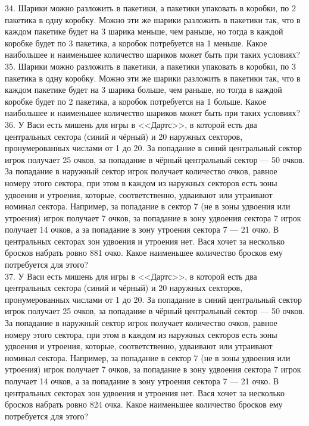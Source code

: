 34. Шарики можно разложить в пакетики, а пакетики упаковать в коробки, по 2 пакетика в одну коробку. Можно эти же шарики разложить в пакетики так, что в каждом пакетике будет на 3 шарика меньше, чем раньше, но тогда в каждой коробке будет по 3 пакетика, а коробок потребуется на 1 меньше. Какое наибольшее и наименьшее количество шариков может быть при таких условиях?\\
35. Шарики можно разложить в пакетики, а пакетики упаковать в коробки, по 3 пакетика в одну коробку. Можно эти же шарики разложить в пакетики так, что в каждом пакетике будет на 3 шарика больше, чем раньше, но тогда в каждой коробке будет по 2 пакетика, а коробок потребуется на 1 больше. Какое наибольшее и наименьшее количество шариков может быть при таких условиях?\\
36. У Васи есть мишень для игры в <<Дартс>>, в которой есть два центральных сектора (синий и чёрный) и 20 наружных секторов, пронумерованных числами от 1 до 20. За попадание в синий центральный сектор игрок получает 25 очков, за попадание в чёрный центральный сектор --- 50 очков. За попадание в наружный сектор игрок получает количество очков, равное номеру этого сектора, при этом в каждом из наружных секторов есть зоны удвоения и утроения, которые, соответственно, удваивают или утраивают номинал сектора. Например, за попадание в сектор 7 (не в зоны удвоения или утроения) игрок получает 7 очков, за попадание в зону удвоения сектора 7 игрок получает 14 очков, а за попадание в зону утроения сектора 7 --- 21 очко. В центральных секторах зон удвоения и утроения нет. Вася хочет за несколько бросков набрать ровно 881 очко. Какое наименьшее количество бросков ему потребуется для этого?\\
37. У Васи есть мишень для игры в <<Дартс>>, в которой есть два центральных сектора (синий и чёрный) и 20 наружных секторов, пронумерованных числами от 1 до 20. За попадание в синий центральный сектор игрок получает 25 очков, за попадание в чёрный центральный сектор --- 50 очков. За попадание в наружный сектор игрок получает количество очков, равное номеру этого сектора, при этом в каждом из наружных секторов есть зоны удвоения и утроения, которые, соответственно, удваивают или утраивают номинал сектора. Например, за попадание в сектор 7 (не в зоны удвоения или утроения) игрок получает 7 очков, за попадание в зону удвоения сектора 7 игрок получает 14 очков, а за попадание в зону утроения сектора 7 --- 21 очко. В центральных секторах зон удвоения и утроения нет. Вася хочет за несколько бросков набрать ровно 824 очка. Какое наименьшее количество бросков ему потребуется для этого?\\
